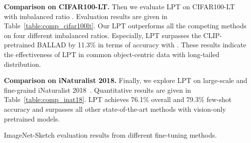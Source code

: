 \documentclass{article} \usepackage{iclr2023_conference,times}
\begin{document}
\textbf{Comparison on CIFAR100-LT. }
Then we evaluate LPT on CIFAR100-LT~\citep{Krizhevsky2009LearningML,cui2019cbloss} with imbalanced ratio . Evaluation results are given in Table~\ref{table:comp_cifar100lt}. Our LPT outperforms all the competing methods on four different imbalanced ratios. 
Especially, LPT surpasses the CLIP-pretrained BALLAD by 11.3\% in terms of accuracy with . These results indicate the effectiveness of LPT in common object-centric data with long-tailed distribution.


\textbf{Comparison on iNaturalist 2018. }
Finally, we explore LPT on large-scale and fine-graind iNaturalist 2018~\citep{van2018inaturalist}.
Quantitative results are given in Table~\ref{table:comp_inat18}. LPT achieves 76.1\% overall and 79.3\% few-shot accuracy and surpasses all other state-of-the-art methods with vision-only pretrained models. 
\begin{table}[h]
\centering
\begin{minipage}[t]{0.48\textwidth}
   \renewcommand\arraystretch{1.3}
\centering
   \caption{ImageNet-Sketch evaluation results from different fine-tuning methods. 
}
    \vspace{-0.5em}
   \setlength{\tabcolsep}{10.6pt} \renewcommand{\arraystretch}{2.2}{ \fontsize{8.3}{3}}
   \label{table:imgnet_sketch}
\end{minipage}\hspace{4mm}
\begin{minipage}[t]{0.48\textwidth}
   \renewcommand\arraystretch{1.3}
\centering
   \caption{Ablation study of LPT with different pretrained model sizes. 
}
    \vspace{-0.5em}
   \setlength{\tabcolsep}{10.6pt} \renewcommand{\arraystretch}{2.2}{ \fontsize{8.3}{3}}
   \label{table:ablation_scale}
\end{minipage}
\vspace{-0.5em}
\end{table}
\end{document}
